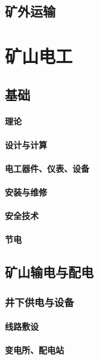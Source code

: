 \documentclass[UTF8]{../../ApplicationUniverse}
\begin{document}
\section{矿外运输}











\chapter{矿山电工}
\section{基础}
    \subsubsection{理论}
    \subsubsection{设计与计算}
    \subsubsection{电工器件、仪表、设备}
    \subsubsection{安装与维修}
    \subsubsection{安全技术}
    \subsubsection{节电}
\section{矿山输电与配电}
    \subsection{井下供电与设备}
        \subsubsection{线路敷设}
        \subsubsection{变电所、配电站}
\end{document}
